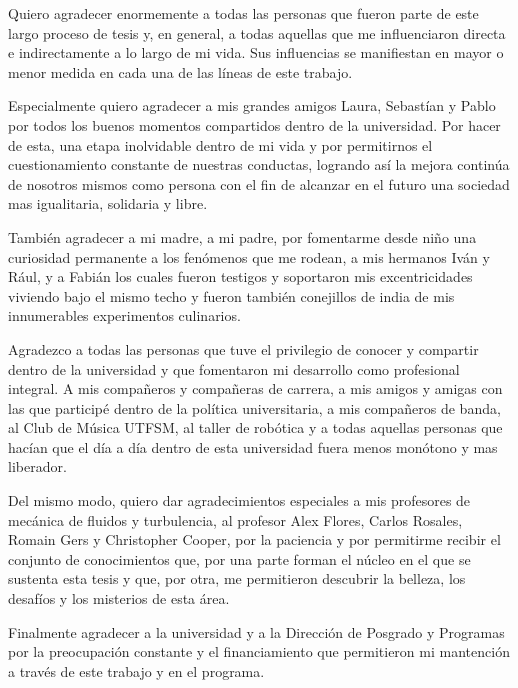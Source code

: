 \vspace{-1.5cm}

Quiero agradecer enormemente a todas las personas que fueron parte de este largo proceso de tesis y, en general, a todas aquellas que me influenciaron directa e indirectamente a lo largo de mi vida. Sus influencias se manifiestan en mayor o menor medida en cada una de las líneas de este trabajo. 

Especialmente quiero agradecer a mis grandes amigos Laura, Sebastían y Pablo por todos los buenos momentos compartidos dentro de la universidad. Por hacer de esta, una etapa inolvidable dentro de mi vida y por permitirnos el cuestionamiento constante de nuestras conductas, logrando así la mejora continúa de nosotros mismos como persona con el fin de alcanzar en el futuro una sociedad mas igualitaria, solidaria y libre. 

También agradecer a mi madre, a mi padre, por fomentarme desde niño una curiosidad permanente a los fenómenos que me rodean, a mis hermanos Iván y Rául, y a Fabián los cuales fueron testigos y soportaron mis excentricidades viviendo bajo el mismo techo y fueron también conejillos de india de mis innumerables experimentos culinarios.

Agradezco a todas las personas que tuve el privilegio de conocer y compartir dentro de la universidad y que fomentaron mi desarrollo como profesional integral. A mis compañeros y compañeras de carrera, a mis amigos y amigas con las que participé dentro de la política universitaria, a mis compañeros de banda, al Club de Música UTFSM, al taller de robótica y a todas aquellas personas que hacían que el día a día dentro de esta universidad fuera menos monótono y mas liberador. 

Del mismo modo, quiero dar agradecimientos especiales a mis profesores de mecánica de fluidos y turbulencia, al profesor Alex Flores, Carlos Rosales, Romain Gers y Christopher Cooper, por la paciencia y por permitirme recibir el conjunto de conocimientos que, por una parte forman el núcleo en el que se sustenta esta tesis y que, por otra, me permitieron descubrir la belleza, los desafíos y los misterios de esta área.

Finalmente agradecer a la universidad y a la Dirección de Posgrado y Programas por la preocupación constante y el financiamiento que permitieron mi mantención a través de este trabajo y en el programa.
